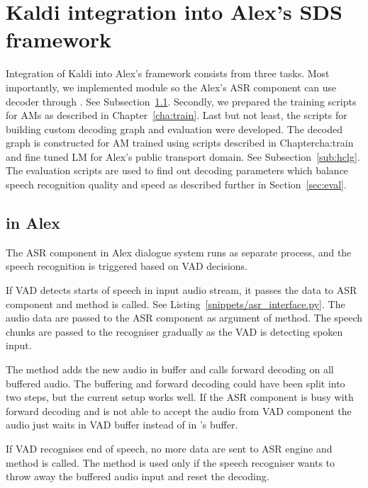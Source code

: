 \section[Kaldi integration into \ac{SDS} framework]{Kaldi integration into Alex's \acl{SDS} framework}
\label{sec:asrsds}

Integration of Kaldi into Alex's framework consists from three tasks.
Most importantly, we implemented  module so the Alex's \ac{ASR} component can use  decoder through .
See Subsection~\ref{sub:asr_component}.
Secondly, we prepared the training scripts for \acp{AM} as described in Chapter~\ref{cha:train}.
Last but not least, the scripts for building custom decoding graph  and evaluation were developed.
The decoded graph  is constructed for \ac{AM} trained using scripts described in Chapter{cha:train} and fine tuned \ac{LM} for Alex's public transport domain.
See Subsection~\ref{sub:hclg}.
The evaluation scripts are used to find out decoding parameters which balance speech recognition quality and speed as described further in Section~\ref{sec:eval}.

\subsection{ in Alex}
\label{sub:asr_component}
The \ac{ASR} component in Alex dialogue system runs as separate process, and the speech recognition is triggered based on \ac{VAD} decisions.

If \ac{VAD} detects starts of speech in input audio stream, it passes the data to \ac{ASR} component
and  method is called. See Listing~\ref{snippets/asr_interface.py}.
The audio data are passed to the ASR component as argument of  method.
The speech chunks are passed to the recogniser gradually as the \ac{VAD} is detecting spoken input.

The method  adds the new audio in  buffer and calls forward decoding on all buffered audio.
The buffering and forward decoding could have been split into two steps, but the current setup works well.
If the \ac{ASR} component is busy with forward decoding and is not able to accept the audio from \ac{VAD} component the audio just waits in \ac{VAD} buffer instead of in 's buffer.

If \ac{VAD} recognises end of speech, no more data are sent to \ac{ASR} engine and  method is called.
The  method is used only if the speech recogniser wants to throw away the buffered audio input and reset the decoding.

